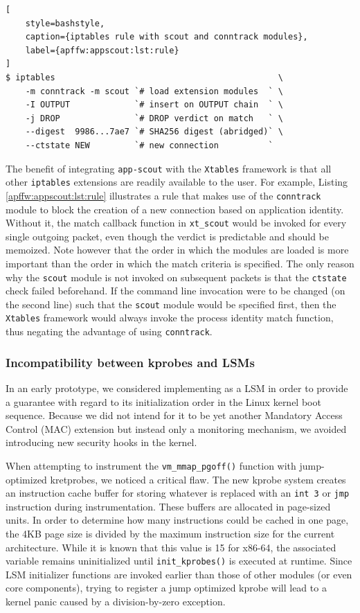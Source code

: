 \begin{lstlisting}[
    style=bashstyle,
    caption={iptables rule with scout and conntrack modules},
    label={apffw:appscout:lst:rule}
]
$ iptables                                             \
    -m conntrack -m scout `# load extension modules  ` \
    -I OUTPUT             `# insert on OUTPUT chain  ` \
    -j DROP               `# DROP verdict on match   ` \
    --digest  9986...7ae7 `# SHA256 digest (abridged)` \
    --ctstate NEW         `# new connection          `
\end{lstlisting}


The benefit of integrating \texttt{app-scout} with the \texttt{Xtables}
framework is that all other \texttt{iptables} extensions are readily available
to the user. For example, Listing \ref{apffw:appscout:lst:rule} illustrates a
rule that makes use of the \texttt{conntrack} module to block the creation of a
new connection based on application identity. Without it, the match callback
function in \texttt{xt\_scout} would be invoked for every single outgoing
packet, even though the verdict is predictable and should be memoized. Note
however that the order in which the modules are loaded is more important than
the order in which the match criteria is specified. The only reason why the
\texttt{scout} module is not invoked on subsequent packets is that the
\texttt{ctstate} check failed beforehand. If the command line invocation were to
be changed (on the second line) such that the \texttt{scout} module would be
specified first, then the \texttt{Xtables} framework would always invoke the
process identity match function, thus negating the advantage of using
\texttt{conntrack}.


\subsubsection{Incompatibility between kprobes and LSMs}
\label{appfw:appscout:incompatibility}

In an early prototype, we considered implementing \scout{} as a LSM in order to
provide a guarantee with regard to its initialization order in the Linux kernel
boot sequence. Because we did not intend for it to be yet another Mandatory
Access Control (MAC) extension but instead only a monitoring mechanism, we
avoided introducing new security hooks in the kernel.

When attempting to instrument the \texttt{vm\_mmap\_pgoff()} function with
jump-optimized kretprobes, we noticed a critical flaw. The new kprobe system
creates an instruction cache buffer for storing whatever is replaced with an
\texttt{int 3} or \texttt{jmp} instruction during instrumentation. These buffers
are allocated in page-sized units. In order to determine how many instructions
could be cached in one page, the 4KB page size is divided by the maximum
instruction size for the current architecture. While it is known that this value
is 15 for x86-64, the associated variable remains uninitialized until
\texttt{init\_kprobes()} is executed at runtime. Since LSM initializer functions
are invoked earlier than those of other modules (or even core components),
trying to register a jump optimized kprobe will lead to a kernel panic caused
by a division-by-zero exception.

